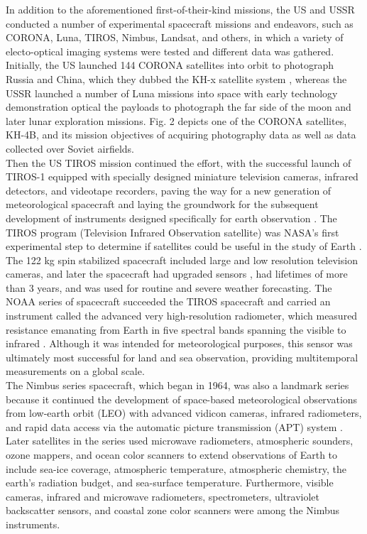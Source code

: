 \documentclass[final,5p,times,twocolumn,authoryear]{elsarticle}
\begin{document}
In addition to the aforementioned first-of-their-kind missions, the US and USSR conducted a number of experimental spacecraft missions and endeavors, such as CORONA, Luna, TIROS, Nimbus, Landsat, and others, in which a variety of electo-optical imaging systems were tested and different data was gathered. Initially, the US launched 144 CORONA satellites into orbit to photograph Russia and China, which they dubbed the KH-x satellite system \citep{ruffner1995corona}, whereas the USSR launched a number of Luna missions into space with early technology demonstration optical the payloads to photograph the far side of the moon and later lunar exploration missions. Fig. 2 depicts one of the CORONA satellites, KH-4B, and its mission objectives of acquiring photography data as well as data collected over Soviet airfields.\\
Then the US TIROS mission continued the effort, with the successful launch of TIROS-1 equipped with specially designed miniature television cameras, infrared detectors, and videotape recorders, paving the way for a new generation of meteorological spacecraft and laying the groundwork for the subsequent development of instruments designed specifically for earth observation \citep{Tatem2008FiftyYO}. The TIROS program (Television Infrared Observation satellite) was NASA's first experimental step to determine if satellites could be useful in the study of Earth \citep{neeck2005nasa}. The 122 kg spin stabilized spacecraft included large and low resolution television cameras, and later the spacecraft had upgraded sensors \citep{neeck2005nasa}, had lifetimes of more than 3 years, and was used for routine and severe weather forecasting. The NOAA series of spacecraft succeeded the TIROS spacecraft and carried an instrument called the advanced very high-resolution radiometer, which measured resistance emanating from Earth in five spectral bands spanning the visible to infrared \citep{Tatem2008FiftyYO}. Although it was intended for meteorological purposes, this sensor was ultimately most successful for land and sea observation, providing multitemporal measurements on a global scale.\\ 
The Nimbus series spacecraft, which began in 1964, was also a landmark series because it continued the development of space-based meteorological observations from low-earth orbit (LEO) with advanced vidicon cameras, infrared radiometers, and rapid data access via the automatic picture transmission (APT) system \citep{neeck2005nasa, Tatem2008FiftyYO}. Later satellites in the series used microwave radiometers, atmospheric sounders, ozone mappers, and ocean color scanners to extend observations of Earth to include sea-ice coverage, atmospheric temperature, atmospheric chemistry, the earth's radiation budget, and sea-surface temperature. Furthermore, visible cameras, infrared and microwave radiometers, spectrometers, ultraviolet backscatter sensors, and coastal zone color scanners were among the Nimbus instruments.\\
\end{document}
